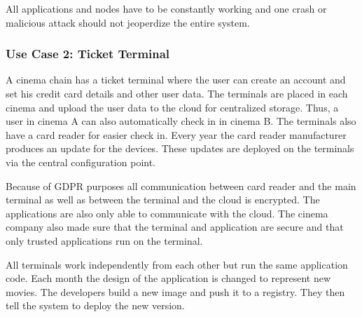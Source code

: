 All applications and nodes have to be constantly working and one crash or malicious attack should not jeoperdize the entire system.

\subsubsection{Use Case 2: Ticket Terminal}
A cinema chain has a ticket terminal where the user can create an account and set his credit card details and other user data. The terminals are placed in each cinema and upload the user data to the cloud for centralized storage. Thus, a user in cinema A can also automatically check in in cinema B. The terminals also have a card reader for easier check in. Every year the card reader manufacturer produces an update for the devices. These updates are deployed on the terminals via the central configuration point.

Because of GDPR purposes all communication between card reader and the main terminal as well as between the terminal and the cloud is encrypted. The applications are also only able to communicate with the cloud.
The cinema company also made sure that the terminal and application are secure and that only trusted applications run on the terminal.

All terminals work independently from each other but run the same application code. Each month the design of the application is changed to represent new movies. The developers build a new image and push it to a registry. They then tell the system to deploy the new version.

